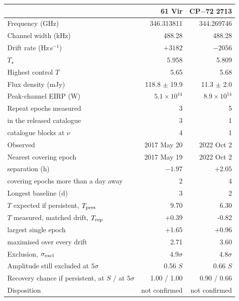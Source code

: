 \begin{tabular}{@{}>{\raggedright\arraybackslash}p{}@{~~}r@{~~}r@{}}
\hline
 & 61 Vir & CP$-$72 2713 \\
\hline
Frequency (GHz) & 346.313811 & 344.269746 \\
Channel width (kHz) & 488.28 & 488.28 \\
Drift rate (Hz\,s$^{-1}$) & $+3182$ & $-2056$ \\
$T_\star$ & 5.958 & 5.809 \\
Highest control $T$ & 5.65 & 5.68 \\
Flux density (mJy) & 118.8 $\pm$ 19.9 & 11.3 $\pm$ 2.0 \\
Peak-channel EIRP (W) & $5.1 \times 10^{14}$ & $8.9 \times 10^{14}$ \\
Repeat epochs measured & 3 & 5 \\
\quad in the released catalogue & 3 & 1 \\
\quad catalogue blocks at $\nu$ & 4 & 1 \\
Observed & 2017 May 20 & 2022 Oct 2 \\
Nearest covering epoch & 2017 May 19 & 2022 Oct 2 \\
\quad separation (h) & $-1.97$ & $+2.05$ \\
\quad covering epochs more than a day away & 2 & 4 \\
Longest baseline (d) & 3 & 2 \\
$T$ expected if persistent, $T_{\rm pers}$ & 9.70 & 6.30 \\
$T$ measured, matched drift, $T_{\rm rep}$ & +0.39 & -0.82 \\
\quad largest single epoch & +1.65 & +0.96 \\
\quad maximised over every drift & 2.71 & 3.60 \\
Exclusion, $\sigma_{\rm excl}$ & 4.9$\sigma$ & 4.8$\sigma$ \\
Amplitude still excluded at $5\sigma$ & 0.56 $S$ & 0.66 $S$ \\
Recovery chance if persistent, at $S$ / at $5\sigma$ & 1.00 / 1.00 & 0.90 / 0.66 \\
Disposition & not confirmed & not confirmed \\
\hline
\end{tabular}
